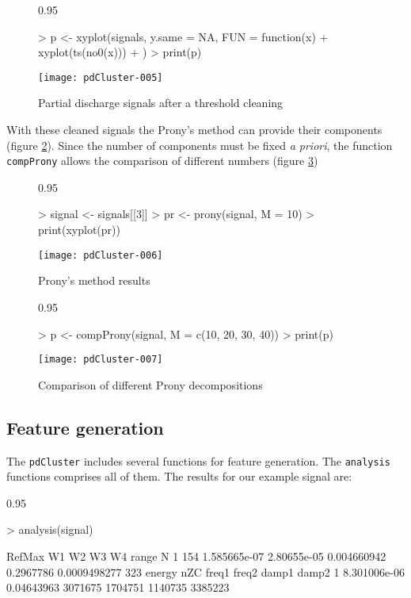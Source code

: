 \documentclass{article}
\renewenvironment{Schunk}{\begin{center}
    \scriptsize
    \begin{boxedminipage}{0.95\textwidth}}{
    \end{boxedminipage}\end{center}}
\begin{document}
\begin{figure}
  \centering
\begin{Schunk}
\begin{Sinput}
> p <- xyplot(signals, y.same = NA, FUN = function(x) {
+     xyplot(ts(no0(x)))
+ })
> print(p)
\end{Sinput}
\end{Schunk}
\texttt{[image: pdCluster-005]}
  \caption{Partial discharge signals after a threshold cleaning}
  \label{fig:no0}
\end{figure}

With these cleaned signals the Prony's method can provide their
components (figure \ref{fig:prony}). Since the number of components
must be fixed \emph{a priori}, the function \texttt{compProny} allows
the comparison of different numbers (figure \ref{fig:pronyComp})

\begin{figure}
  \centering
\begin{Schunk}
\begin{Sinput}
> signal <- signals[[3]]
> pr <- prony(signal, M = 10)
> print(xyplot(pr))
\end{Sinput}
\end{Schunk}
\texttt{[image: pdCluster-006]}
  \caption{Prony's method results}
  \label{fig:prony}
\end{figure}

\begin{figure}
  \centering
\begin{Schunk}
\begin{Sinput}
> p <- compProny(signal, M = c(10, 20, 30, 40))
> print(p)
\end{Sinput}
\end{Schunk}
\texttt{[image: pdCluster-007]}
  \caption{Comparison of different Prony decompositions}
  \label{fig:pronyComp}
\end{figure}
 
\subsection{Feature generation}
\label{sec:features}

The \texttt{pdCluster} includes several functions for feature
generation. The \texttt{analysis} functions comprises all of them. The
results for our example signal are:
\begin{Schunk}
\begin{Sinput}
> analysis(signal)
\end{Sinput}
\begin{Soutput}
  RefMax           W1          W2          W3        W4        range   N
1    154 1.585665e-07 2.80655e-05 0.004660942 0.2967786 0.0009498277 323
        energy        nZC   freq1   freq2   damp1   damp2
1 8.301006e-06 0.04643963 3071675 1704751 1140735 3385223
\end{Soutput}
\end{Schunk}
\end{document}
